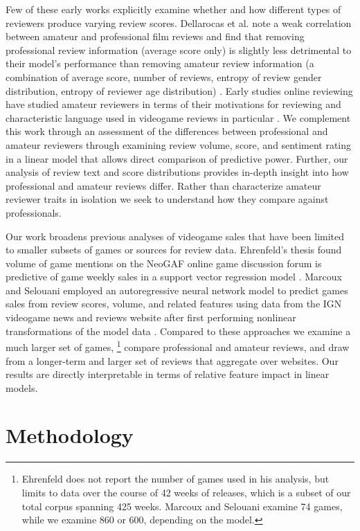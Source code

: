 \documentclass[letterpaper]{article}
\begin{document}
Few of these early works explicitly examine whether and how different types of reviewers produce varying review scores. Dellarocas et al. note a weak correlation between amateur and professional film reviews and find that removing professional review information (average score only) is slightly less detrimental to their model's performance than removing amateur review information (a combination of average score, number of reviews, entropy of review gender distribution, entropy of reviewer age distribution) \cite{dellarocas2007exploring}. Early studies online reviewing have studied amateur reviewers in terms of their motivations for reviewing \cite{gilbert2010deja} and characteristic language used in videogame reviews in particular \cite{zagal2011natural}. We complement this work through an assessment of the differences between professional and amateur reviewers through examining review volume, score, and sentiment rating in a linear model that allows direct comparison of predictive power. Further, our analysis of review text and score distributions provides in-depth insight into how professional and amateur reviews differ. Rather than characterize amateur reviewer traits in isolation we seek to understand how they compare against professionals.

Our work broadens previous analyses of videogame sales that have been limited to smaller subsets of games or sources for review data. Ehrenfeld's thesis found volume of game mentions on the NeoGAF online game discussion forum is predictive of game weekly sales in a support vector regression model \cite{ehrenfeld2011predicting}. Marcoux and Selouani employed an autoregressive neural network model to predict games sales from review scores, volume, and related features using data from the IGN videogame news and reviews website after first performing nonlinear transformations of the model data \cite{marcoux2009hybrid}.
Compared to these approaches we examine a much larger set of games,
\footnote{Ehrenfeld does not report the number of games used in his analysis, but limits to data over the course of 42 weeks of releases, which is a subset of our total corpus spanning 425 weeks. Marcoux and Selouani examine 74 games, while we examine 860 or 600, depending on the model.}
compare professional and amateur reviews, and draw from a longer-term and larger set of reviews that aggregate over websites. Our results are directly interpretable in terms of relative feature impact in linear models.


\section{Methodology}
\end{document}

